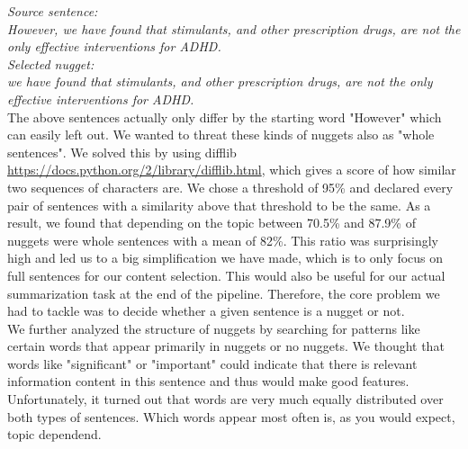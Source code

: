 \textit{Source sentence:} \\ 
\textit{However, we have found that stimulants, and other prescription drugs, are not the only effective interventions for ADHD.} \\

\textit{Selected nugget:} \\
\textit{we have found that stimulants, and other prescription drugs, are not the only effective interventions for ADHD.} \\

The above sentences actually only differ by the starting word "However" which can easily left out. We wanted to threat these kinds of nuggets also as "whole sentences". We solved this by using difflib \lbrack \url{https://docs.python.org/2/library/difflib.html}\rbrack, which gives a score of how similar two sequences of characters are. We chose a threshold of 95\% and declared every pair of sentences with a similarity above that threshold to be the same. As a result, we found that depending on the topic between 70.5\% and 87.9\% of nuggets were whole sentences with a mean of 82\%. This ratio was surprisingly high and led us to a big simplification we have made, which is to only focus on full sentences for our content selection. This would also be useful for our actual summarization task at the end of the pipeline. Therefore, the core problem we had to tackle was to decide whether a given sentence is a nugget or not.\\
We further analyzed the structure of nuggets by searching for patterns like certain words that appear primarily in nuggets or no nuggets. We thought that words like "significant" or "important" could indicate that there is relevant information content in this sentence and thus would make good features. Unfortunately, it turned out that words are very much equally distributed over both types of sentences. Which words appear most often is, as you would expect, topic dependend.


